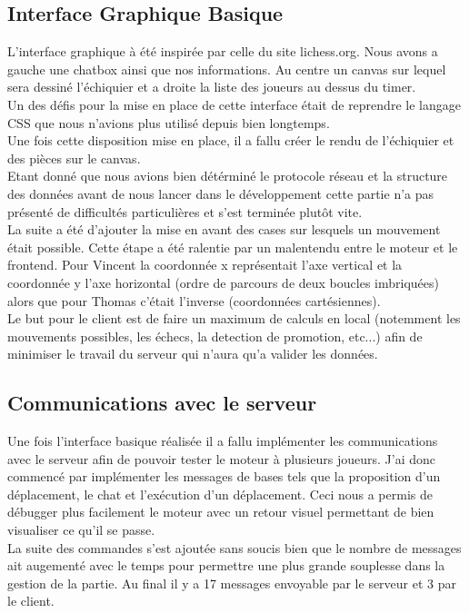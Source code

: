 \documentclass{article}
\begin{document}
\subsection{Interface Graphique Basique}
L'interface graphique à été inspirée par celle du site lichess.org. Nous avons a gauche une chatbox ainsi que nos informations. Au centre un canvas sur lequel sera dessiné l'échiquier et a droite la liste des joueurs au dessus du timer.\\
Un des défis pour la mise en place de cette interface était de reprendre le langage CSS que nous n'avions plus utilisé depuis bien longtemps.\\
Une fois cette disposition mise en place, il a fallu créer le rendu de l'échiquier et des pièces sur le canvas.\\
Etant donné que nous avions bien détérminé le protocole réseau et la structure des données avant de nous lancer dans le développement cette partie n'a pas présenté de difficultés particulières et s'est terminée plutôt vite.\\
La suite a été d'ajouter la mise en avant des cases sur lesquels un mouvement était possible. Cette étape a été ralentie par un malentendu entre le moteur et le frontend. Pour Vincent la coordonnée x représentait l'axe vertical et la coordonnée y l'axe horizontal (ordre de parcours de deux boucles imbriquées) alors que pour Thomas c'était l'inverse (coordonnées cartésiennes).\\
Le but pour le client est de faire un maximum de calculs en local (notemment les mouvements possibles, les échecs, la detection de promotion, etc...) afin de minimiser le travail du serveur qui n'aura qu'a valider les données.

\subsection{Communications avec le serveur}
Une fois l'interface basique réalisée il a fallu implémenter les communications avec le serveur afin de pouvoir tester le moteur à plusieurs joueurs. J'ai donc commencé par implémenter les messages de bases tels que la proposition d'un déplacement, le chat et l'exécution d'un déplacement. Ceci nous a permis de débugger plus facilement le moteur avec un retour visuel permettant de bien visualiser ce qu'il se passe.\\
La suite des commandes s'est ajoutée sans soucis bien que le nombre de messages ait augementé avec le temps pour permettre une plus grande souplesse dans la gestion de la partie. Au final il y a 17 messages envoyable par le serveur et 3 par le client.
\end{document}
